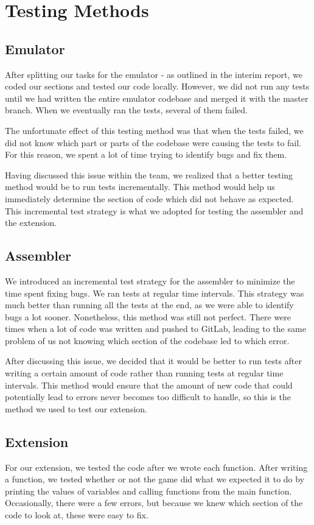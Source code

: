 \documentclass[11pt]{article}
\begin{document}
\section{Testing Methods}
\subsection{Emulator}
After splitting our tasks for the emulator - as outlined in the interim report, we coded our sections and tested our code locally. However, we did not run any tests until we had written the entire emulator codebase and merged it with the master branch. When we eventually ran the tests, several of them failed. 

The unfortunate effect of this testing method was that when the tests failed, we did not know which part or parts of the codebase were causing the tests to fail. For this reason, we spent a lot of time trying to identify bugs and fix them. 

Having discussed this issue within the team, we realized that a better testing method would be to run tests incrementally. This method would help us immediately determine the section of code which did not behave as expected. This incremental test strategy is what we adopted for testing the assembler and the extension. 

\subsection{Assembler}
We introduced an incremental test strategy for the assembler to minimize the time spent fixing bugs. We ran tests at regular time intervals. This strategy was much better than running all the tests at the end, as we were able to identify bugs a lot sooner. Nonetheless, this method was still not perfect. There were times when a lot of code was written and pushed to GitLab, leading to the same problem of us not knowing which section of the codebase led to which error. 

After discussing this issue, we decided that it would be better to run tests after writing a certain amount of code rather than running tests at regular time intervals. This method would ensure that the amount of new code that could potentially lead to errors never becomes too difficult to handle, so this is the method we used to test our extension.

\subsection{Extension}
For our extension, we tested the code after we wrote each function. After writing a function, we tested whether or not the game did what we expected it to do by printing the values of variables and calling functions from the main function. Occasionally, there were a few errors, but because we knew which section of the code to look at, these were easy to fix. 
\end{document}
